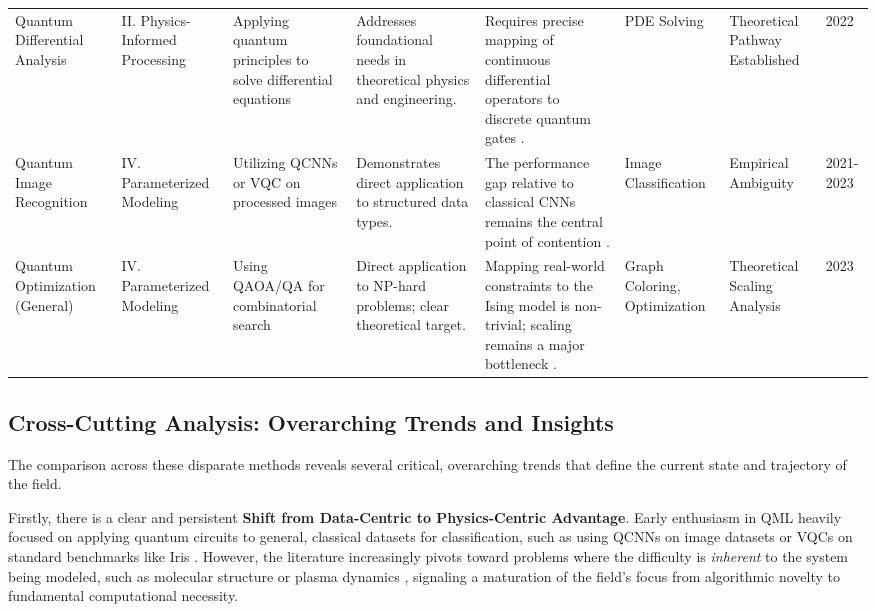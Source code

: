 \documentclass{article}
\begin{document}
\begin{table}[ht]
{\begin{tabular}{llllllll}
Quantum Differential Analysis & II. Physics-Informed Processing & Applying quantum principles to solve differential equations & Addresses foundational needs in theoretical physics and engineering. & Requires precise mapping of continuous differential operators to discrete quantum gates \cite{kiani2022quantum}. & PDE Solving & Theoretical Pathway Established & 2022 \\
Quantum Image Recognition & IV. Parameterized Modeling & Utilizing QCNNs or VQC on processed images & Demonstrates direct application to structured data types. & The performance gap relative to classical CNNs remains the central point of contention \cite{srinivasu2021classification}. & Image Classification & Empirical Ambiguity & 2021-2023 \\
Quantum Optimization (General) & IV. Parameterized Modeling & Using QAOA/QA for combinatorial search & Direct application to NP-hard problems; clear theoretical target. & Mapping real-world constraints to the Ising model is non-trivial; scaling remains a major bottleneck \cite{sankar2024benchmarking}. & Graph Coloring, Optimization & Theoretical Scaling Analysis & 2023 \\
\bottomrule
\end{tabular}
}
\end{table}

\subsection{Cross-Cutting Analysis: Overarching Trends and Insights}

\label{sec:cross\_cutting\_analysis\_overarching\_trend}

The comparison across these disparate methods reveals several critical, overarching trends that define the current state and trajectory of the field.

Firstly, there is a clear and persistent \textbf{Shift from Data-Centric to Physics-Centric Advantage}. Early enthusiasm in QML heavily focused on applying quantum circuits to general, classical datasets for classification, such as using QCNNs on image datasets \cite{goto2021universal} or VQCs on standard benchmarks like Iris \cite{piatrenka2022quantum}. However, the literature increasingly pivots toward problems where the difficulty is \textit{inherent} to the system being modeled, such as molecular structure or plasma dynamics \cite{kuhne2020electronic}, signaling a maturation of the field's focus from algorithmic novelty to fundamental computational necessity.
\end{document}
